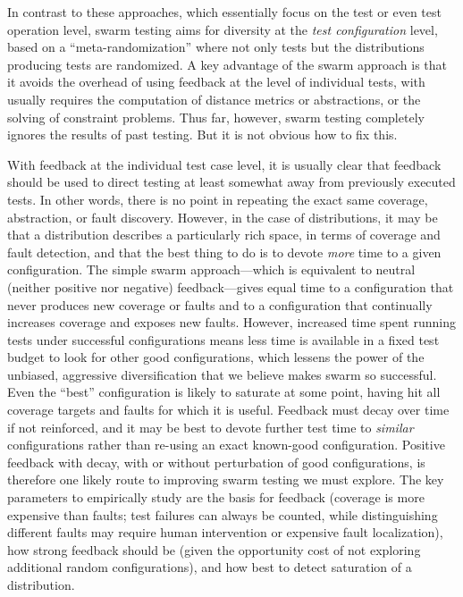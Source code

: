 In contrast to these approaches, which essentially focus on the test
or even test operation level, swarm testing aims for diversity at the \emph{test
configuration} level, based on a ``meta-randomization'' where not only
tests but the distributions producing tests are randomized.  A key
advantage of the swarm approach is that it avoids the overhead of
using feedback at the level of individual tests, with usually requires
the computation of distance metrics or abstractions, or the solving of
constraint problems.  Thus far, however, swarm testing completely
ignores the results of past testing.  
%
But it is not obvious how to fix this.


With feedback at the individual test case level, it is usually clear
that feedback should be used to direct testing at least somewhat away
from previously executed tests.  
%
In other words, there is no point in repeating the exact same
coverage, abstraction, or fault discovery.  
%
However, in the case of distributions, it may be that a distribution
describes a particularly rich space, in terms of coverage and fault
detection, and that the best thing to do is to devote \emph{more} time
to a given configuration.
%
The simple swarm approach---which is equivalent to neutral (neither
positive nor negative) feedback---gives equal time to a configuration
that never produces new coverage or faults and to a configuration that
continually increases coverage and exposes new faults.  
%
However, increased time spent running tests under successful
configurations means less time is available in a fixed test budget to
look for other good configurations, which lessens the power of the
unbiased, aggressive diversification that we believe makes swarm so
successful.
%
Even the ``best'' configuration is likely to saturate at some point,
having hit all coverage targets and faults for which it is useful.
%
Feedback must decay over time if not reinforced, and it may be best to
devote further test time to \emph{similar} configurations rather than
re-using an exact known-good configuration.  Positive feedback with decay,
with or without perturbation of good configurations, is therefore one
likely route to improving swarm testing we must explore.  The key
parameters to empirically study are the basis for feedback (coverage
is more expensive than faults; test failures can always be counted,
while distinguishing different faults may require human intervention
or expensive fault localization), how strong feedback should be (given
the opportunity cost of not exploring additional random configurations), and
how best to detect saturation of a distribution.


